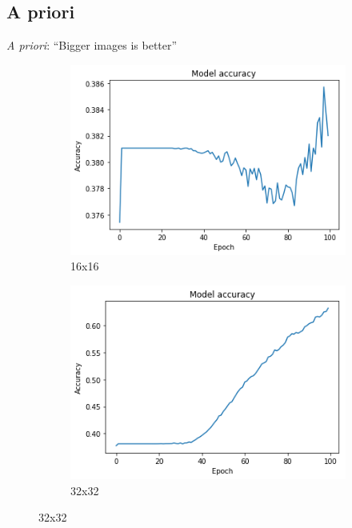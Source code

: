 \subsection{A priori}
\begin{frame}[c]{\emph{A priori}: ``Bigger images is better''}
    \begin{figure}
        \centering
        \begin{subfigure}[b]{0.4\linewidth}
            \centering
            \includegraphics[width=\linewidth]{16x16.png}
            \caption{16x16}
        \end{subfigure}
        \begin{subfigure}[b]{0.4\linewidth}
            \centering
            \includegraphics[width=\linewidth]{32x32.png}
            \caption{32x32}
        \end{subfigure}

\end{figure}
\end{frame}

